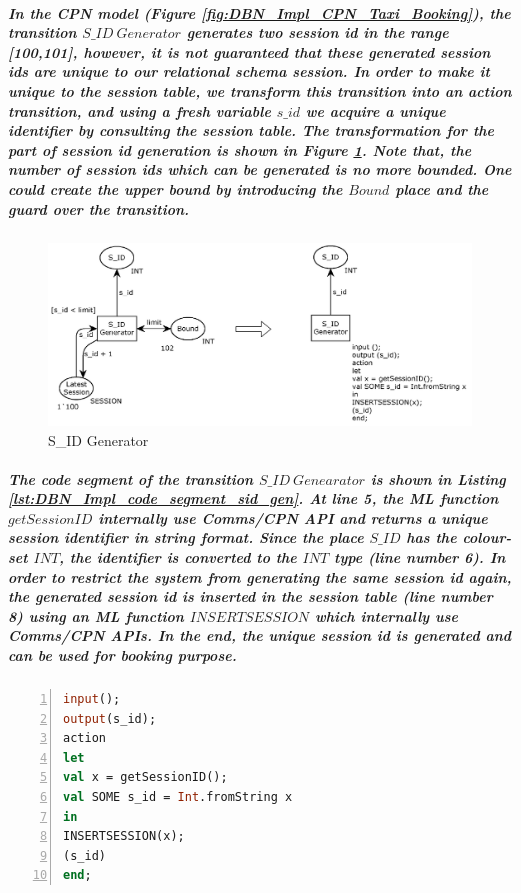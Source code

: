 \subparagraph*{\textnormal{In the CPN model (Figure \ref{fig:DBN_Impl_CPN_Taxi_Booking}), the transition $\mathit{S\_ID\ Generator}$ generates two session id in the range [100,101], however, it is not guaranteed that these generated session ids are unique to our relational schema \textit{session}. In order to make it unique to the session table, we transform this transition into an action transition, and using a fresh variable $\mathit{s\_id}$ we acquire a unique identifier by consulting the \textit{session} table. The transformation for the part of session id generation is shown in Figure \ref{fig:DBN_Impl_SID_Generator}. Note that, the number of session ids which can be generated is no more bounded. One could create the upper bound by introducing the $\mathit{Bound}$ place and the guard over the transition.}}

\begin{figure}[!htbp]
	\centering
	\includegraphics[scale = 0.35]{DBN_Impl_SID_Generator.pdf}
	\caption{S\_ID Generator}
	\label{fig:DBN_Impl_SID_Generator}
\end{figure}

\subparagraph*{\textnormal{The code segment of the transition $\mathit{S\_ID\ Genearator}$ is shown in Listing \ref{lst:DBN_Impl_code_segment_sid_gen}. At line 5, the ML function $\mathit{getSessionID}$ internally use Comms/CPN API and returns a unique session identifier in string format. Since the place $\mathit{S\_ID}$ has the colour-set $\mathit{INT}$, the identifier is converted to the $\mathit{INT}$ type (line number 6). In order to restrict the system from generating the same session id again, the generated session id is inserted in the \textit{session} table (line number 8) using an ML function $\mathit{INSERTSESSION}$ which internally use Comms/CPN APIs. In the end, the unique session id is generated and can be used for booking purpose.}}

\subparagraph*{}
\begin{lstlisting}[showstringspaces=false, language = ML, caption = code segment of transition : $\mathit{S\_ID\ Generator}$, captionpos=b, label = lst:DBN_Impl_code_segment_sid_gen, numbers=left,
stepnumber=1]
input();
output(s_id);
action
let
val x = getSessionID();
val SOME s_id = Int.fromString x 
in
INSERTSESSION(x);
(s_id)
end;
\end{lstlisting}

